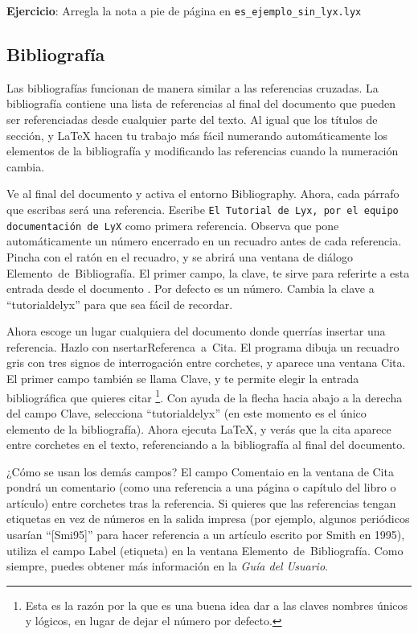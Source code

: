 \textbf{Ejercicio}: Arregla la nota a pie de página en \texttt{es\_ejemplo\_sin\_lyx.lyx}


\subsection{Bibliografía}

\label{sec:bibliographies}Las bibliografías funcionan de manera similar
a las referencias cruzadas. La bibliografía contiene una lista de
referencias al final del documento que pueden ser referenciadas desde
cualquier parte del texto. Al igual que los títulos de sección, \LyX{}
y \LaTeX{} hacen tu trabajo más fácil numerando automáticamente los
elementos de la bibliografía y modificando las referencias cuando
la numeración cambia.

Ve al final del documento y activa el entorno \textsf{Bibliography}.
Ahora, cada párrafo que escribas será una referencia. Escribe \texttt{El
Tutorial de Lyx, por el equipo documentación de LyX} como primera
referencia. Observa que \LyX{} pone automáticamente un número encerrado
en un recuadro antes de cada referencia. Pincha con el ratón en el
recuadro, y se abrirá una ventana de diálogo \textsf{Elemento~de~Bibliografía}.
El primer campo, la clave, te sirve para referirte a esta entrada
desde el documento \LyX{}. Por defecto es un número. Cambia la clave
a {}``tutorialdelyx'' para que sea fácil de recordar.

Ahora escoge un lugar cualquiera del documento donde querrías insertar
una referencia. Hazlo con \textsf{}\textsf{nsertar\lyxarrow{}Referenc}\textsf{}\textsf{a~a~Cita\@.}
El programa dibuja un recuadro gris con tres signos de interrogación
entre corchetes, y aparece una ventana \textsf{Cita}. El primer campo
también se llama \textsf{Clave}, y te permite elegir la entrada bibliográfica
que quieres citar%
\footnote{Esta es la razón por la que es una buena idea dar a las claves nombres
únicos y lógicos, en lugar de dejar el número por defecto.%
}. Con ayuda de la flecha hacia abajo a la derecha del campo \textsf{Clave},
selecciona {}``tutorialdelyx'' (en este momento es el único elemento
de la bibliografía). Ahora ejecuta \LaTeX{}, y verás que la cita aparece
entre corchetes en el texto, referenciando a la bibliografía al final
del documento.

¿Cómo se usan los demás campos? El campo \textsf{Comenta}\textsf{}\textsf{io}
en la ventana de \textsf{Cita} pondrá un comentario (como una referencia
a una página o capítulo del libro o artículo) entre corchetes tras
la referencia. Si quieres que las referencias tengan etiquetas en
vez de números en la salida impresa (por ejemplo, algunos periódicos
usarían {}``{[}Smi95{]}'' para hacer referencia a un artículo escrito
por Smith en 1995), utiliza el campo \textsf{Label} (etiqueta) en
la ventana \textsf{Elemento~de~Bibliografía}. Como siempre, puedes
obtener más información en la \emph{Guía del Usuario}.

